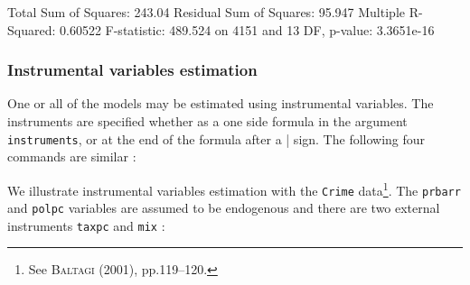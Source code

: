 \documentclass[a4paper]{article}
\begin{document}
\begin{Schunk}
\begin{Soutput}
Total Sum of Squares: 243.04
Residual Sum of Squares: 95.947
Multiple R-Squared: 0.60522
F-statistic: 489.524 on 4151 and 13 DF, p-value: 3.3651e-16
\end{Soutput}
\end{Schunk}

\subsubsection{Instrumental variables estimation}


One or all of the models may be estimated using instrumental
variables. The instruments are specified whether as a one side formula
in the argument \texttt{instruments}, or at the end of the formula
after a | sign. The following four commands are similar :

We illustrate instrumental variables estimation with the
\texttt{Crime} data\footnote{See \textsc{Baltagi} (2001),
  pp.119--120.}.  The \texttt{prbarr} and \texttt{polpc} variables are
assumed to be endogenous and there are two external instruments
\texttt{taxpc} and \texttt{mix} :
\end{document}

